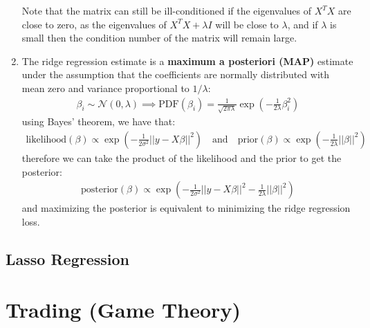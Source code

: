 \documentclass[letterpaper, 11pt]{article}
\newcommand{\normal}[2]{\mathcal{N}\left(#1,#2\right)}
\newcommand{\1}{\mathds{1}}	%
\theoremstyle{definition}
\begin{document}
\begin{enumerate}
    Note that the matrix can still be ill-conditioned if the eigenvalues of $X^TX$ are close to zero, as the eigenvalues of $X^TX + \lambda I$ will be close to $\lambda$, 
    and if $\lambda$ is small then the condition number of the matrix will remain large.
    \item The ridge regression estimate is a \textbf{maximum a posteriori (MAP)} estimate under the 
    assumption that the coefficients are normally distributed with mean zero and variance proportional to $1 / \lambda$:
    \begin{align}
        \beta_i \sim \normal{0}{\lambda} \implies \text{PDF}(\beta_i) = \frac{1}{\sqrt{2\pi \lambda}} \exp\left(-\frac{1}{2\lambda} \beta_i^2\right)
    \end{align}
    using Bayes' theorem, we have that:
    \begin{align}
        \text{likelihood}(\beta) \propto \exp\left(-\frac{1}{2\sigma^2} ||y - X \beta||^2\right) \quad \text{and} \quad \text{prior}(\beta) \propto \exp\left(-\frac{1}{2\lambda} ||\beta||^2\right)
    \end{align}
    therefore we can take the product of the likelihood and the prior to get the posterior:
    \begin{align}
        \text{posterior}(\beta) \propto \exp\left(-\frac{1}{2\sigma^2} ||y - X \beta||^2 - \frac{1}{2\lambda} ||\beta||^2\right)
    \end{align}
    and maximizing the posterior is equivalent to minimizing the ridge regression loss.
\end{enumerate}
\subsection{Lasso Regression}

\section{Trading (Game Theory)}
\end{document}
